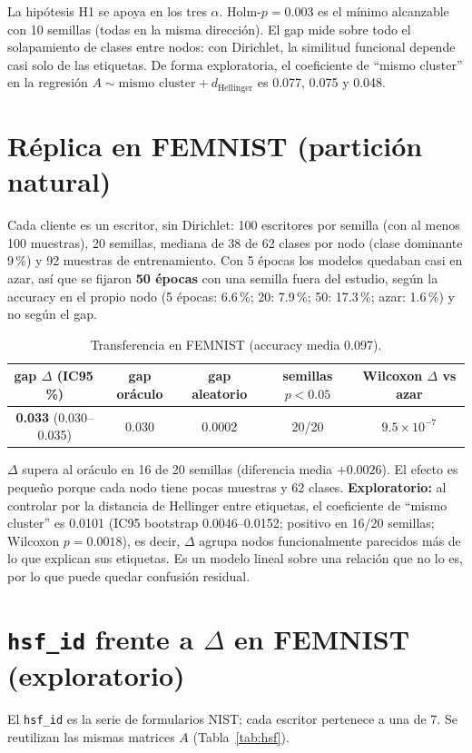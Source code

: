 \documentclass[11pt,a4paper]{article}
\begin{document}
La hipótesis H1 se apoya en los tres $\alpha$. Holm-$p=0.003$ es el mínimo alcanzable con 10 semillas (todas en la misma dirección). El gap mide sobre todo el solapamiento de clases entre nodos: con Dirichlet, la similitud funcional depende casi solo de las etiquetas. De forma exploratoria, el coeficiente de ``mismo cluster'' en la regresión $A\sim\text{mismo cluster}+d_{\text{Hellinger}}$ es 0.077, 0.075 y 0.048.

\section{Réplica en FEMNIST (partición natural)}
Cada cliente es un escritor, sin Dirichlet: 100 escritores por semilla (con al menos 100 muestras), 20 semillas, mediana de 38 de 62 clases por nodo (clase dominante 9\,\%) y 92 muestras de entrenamiento. Con 5 épocas los modelos quedaban casi en azar, así que se fijaron \textbf{50 épocas} con una semilla fuera del estudio, según la accuracy en el propio nodo (5 épocas: 6.6\,\%; 20: 7.9\,\%; 50: 17.3\,\%; azar: 1.6\,\%) y no según el gap.

\begin{table}[h]
\centering\small
\begin{tabular}{ccccc}
\toprule
gap $\Delta$ (IC95\,\%) & gap oráculo & gap aleatorio & semillas $p<0.05$ & Wilcoxon $\Delta$ vs azar\\
\midrule
\textbf{0.033} (0.030--0.035) & 0.030 & 0.0002 & 20/20 & $9.5\times10^{-7}$\\
\bottomrule
\end{tabular}
\caption{Transferencia en FEMNIST (accuracy media 0.097).}
\end{table}

$\Delta$ supera al oráculo en 16 de 20 semillas (diferencia media $+0.0026$). El efecto es pequeño porque cada nodo tiene pocas muestras y 62 clases. \textbf{Exploratorio:} al controlar por la distancia de Hellinger entre etiquetas, el coeficiente de ``mismo cluster'' es 0.0101 (IC95 bootstrap 0.0046--0.0152; positivo en 16/20 semillas; Wilcoxon $p=0.0018$), es decir, $\Delta$ agrupa nodos funcionalmente parecidos más de lo que explican sus etiquetas. Es un modelo lineal sobre una relación que no lo es, por lo que puede quedar confusión residual.

\section{\texttt{hsf\_id} frente a $\Delta$ en FEMNIST (exploratorio)}
El \texttt{hsf\_id} es la serie de formularios NIST; cada escritor pertenece a una de 7. Se reutilizan las mismas matrices $A$ (Tabla~\ref{tab:hsf}).
\end{document}
